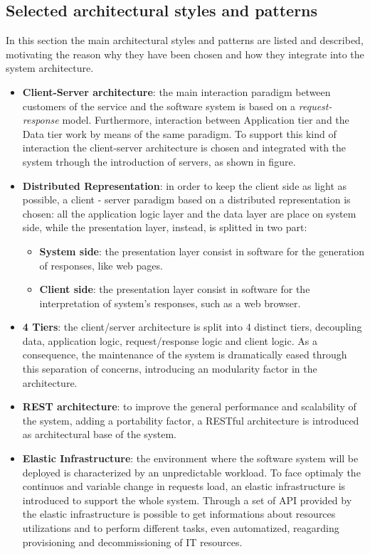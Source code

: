 \subsection{Selected architectural styles and patterns}

\label{sec:selected-styles-patterns}

In this section the main architectural styles and patterns are listed and described, motivating the reason why they have been chosen and how they integrate into the system architecture.

\begin{itemize}	
	\item \textbf{Client-Server architecture}: the main interaction paradigm between customers of the service and the software system is based on a \textit{request-response} model. Furthermore, interaction between Application tier and the Data tier work by means of the same paradigm. To support this kind of interaction the client-server architecture is chosen and integrated with the system trhough the introduction of servers, as shown in figure. 
	\item \textbf{Distributed Representation}: in order to keep the client side as light as possible, a client - server paradigm based on a distributed representation is chosen: all the application logic layer and the data layer are place on system side, while the presentation layer, instead, is splitted in two part:
	\begin{itemize}
		\item \textbf{System side}: the presentation layer consist in software for the generation of responses, like web pages.
		\item \textbf{Client side}: the presentation layer consist in software for the interpretation of system's responses, such as a web browser.
	\end{itemize}
	\item \textbf{4 Tiers}: the client/server architecture is split into 4 distinct tiers, decoupling data, application logic, request/response logic and client logic. As a consequence, the maintenance of the system is dramatically eased through this separation of concerns, introducing an modularity factor in the architecture.
	\item \textbf{REST architecture}: to improve the general performance and scalability of the system, adding a portability factor, a RESTful architecture is introduced as architectural base of the system.
	\item \textbf{Elastic Infrastructure}: the environment where the software system will be deployed is characterized by an unpredictable workload. To face optimaly the continuos and variable change in requests load, an elastic infrastructure is introduced to support the whole system. Through a set of API provided by the elastic infrastructure is possible to get informations about resources utilizations and to perform different tasks, even automatized, reagarding provisioning and decommissioning of IT resources.

\end{itemize}
